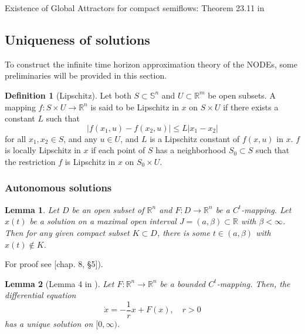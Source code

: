 \documentclass{article}
\newtheorem{lemma}{Lemma}
\theoremstyle{definition} \newtheorem{definition}{Definition}
\theoremstyle{remark} \newtheorem{remark}{Remark}
\newcounter{ct}
\begin{document}
 Existence of Global Attractors for compact semiflows: Theorem 23.11 in \citep{sell2013dynamics}
 


\subsection{Uniqueness of solutions}\label{sec:solutions}
To construct the infinite time horizon approximation theory of the NODEs, some preliminaries will be provided in this section.


\begin{definition}[Lipschitz]
 Let both $S \subset \mathbb{S}^n$ and $U \subset \mathbb{R}^m$ be open subsets.
 A mapping $f: S \times U \rightarrow \mathbb{R}^n$ is said to be Lipschitz in $x$ on $S \times U$ if there exists a constant $L$ such that
\[
|f(x_1, u) - f(x_2, u)| \leq L |x_1 - x_2|
\]
for all $x_1, x_2 \in S$, and any $u \in U$, and $L$ is a Lipschitz constant of $f(x, u)$ in $x$. $f$ is locally Lipschitz in $x$ if each point of $S$ has a neighborhood $S_0 \subset S$ such that the restriction $f$ is Lipschitz in $x$ on $S_0 \times U$.
\end{definition}




\subsubsection{Autonomous solutions}\label{sec:autonomousunique}
\begin{lemma}
Let \( D \) be an open subset of \( \mathbb{R}^n \) and \( F : D \to \mathbb{R}^n \) be a \( C^t \)-mapping. 
Let \( x(t) \) be a solution on a maximal open interval \( J = (a, \beta) \subset \mathbb{R} \) with \( \beta < \infty \). 
Then for any given compact subset \( K \subset D \), there is some \( t \in (a, \beta) \) with \( x(t) \notin K \). 
\end{lemma}	
For proof see \citep{hirsch1974nonautonomous}[chap. 8, §5]).


\begin{lemma}[Lemma 4 in \citep{funahashi1993approximation}]
Let \( F: \mathbb{R}^n \to \mathbb{R}^n \) be a bounded \( C^t \)-mapping. Then, the differential equation
\[
\dot{x} = -\frac{1}{r} x + F(x), \quad r > 0
\]
has a unique solution on \([0, \infty)\).
\end{lemma}	
\end{document}

